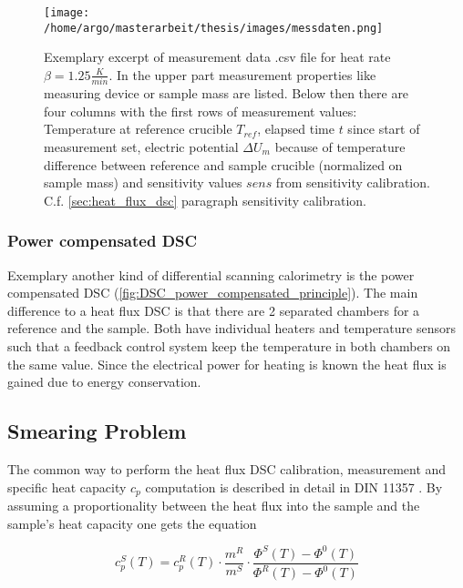 \documentclass{scrartcl}[12pt, halfparskip]
\numberwithin{equation}{section}
\numberwithin{figure}{section}
\numberwithin{table}{section}
\begin{document}
\begin{figure}[H]
	\centering
	\texttt{[image: /home/argo/masterarbeit/thesis/images/messdaten.png]}
	\caption{Exemplary excerpt of measurement data .csv file for heat rate $\beta=1.25 \frac{K}{min}$. In the upper part measurement properties like measuring device or sample mass are listed. Below then there are four columns with the first rows of measurement values: Temperature at reference crucible $T_{ref}$, elapsed time $t$ since start of measurement set, electric potential $\Delta U_m$ because of temperature difference between reference and sample crucible (normalized on sample mass) and sensitivity values $sens$ from sensitivity calibration. \\
	C.f. \cref{sec:heat_flux_dsc} paragraph sensitivity calibration.}
	\label{fig:measurement_csv_data}
\end{figure}


\subsubsection{Power compensated DSC}
\label{sec:power_compensated_dsc}
Exemplary another kind of differential scanning calorimetry is the
power compensated DSC (\cref{fig:DSC_power_compensated_principle}). 
The main difference to a heat flux DSC is that there are 2 separated chambers for a reference and the sample. Both have individual heaters and temperature sensors such that a feedback control system keep the temperature in both chambers on the same value. Since the electrical power for heating is known the heat flux is gained due to energy conservation. \\


\subsection{Smearing Problem}
\label{sec:smearing_problem}
The common way to perform the heat flux DSC calibration, measurement and specific heat capacity $c_p$ computation is described in detail in DIN 11357 \cite{DIN_11357}. By assuming a proportionality between the heat flux into the sample and the sample's heat capacity one gets the equation

\begin{equation}
	c_p^S(T) = c_p^{R}(T) \cdot \frac{m^R}{m^S} \cdot \frac{\varPhi^S(T) - \varPhi^0(T)}{\varPhi^R(T) - \varPhi^0(T)}
	\label{eq:c_p_formula_DIN}
\end{equation}
\end{document}
